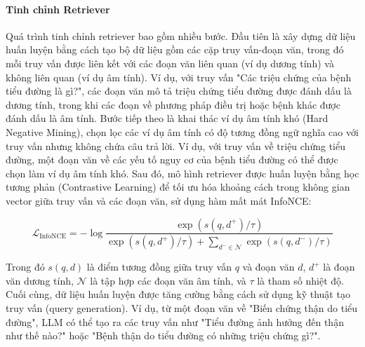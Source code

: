 \paragraph{Tinh chỉnh Retriever}
Quá trình tinh chỉnh retriever bao gồm nhiều bước. Đầu tiên là xây dựng dữ liệu huấn luyện bằng cách tạo bộ dữ liệu gồm các cặp truy vấn-đoạn văn, trong đó mỗi truy vấn được liên kết với các đoạn văn liên quan (ví dụ dương tính) và không liên quan (ví dụ âm tính). Ví dụ, với truy vấn "Các triệu chứng của bệnh tiểu đường là gì?", các đoạn văn mô tả triệu chứng tiểu đường được đánh dấu là dương tính, trong khi các đoạn về phương pháp điều trị hoặc bệnh khác được đánh dấu là âm tính. Bước tiếp theo là khai thác ví dụ âm tính khó (Hard Negative Mining), chọn lọc các ví dụ âm tính có độ tương đồng ngữ nghĩa cao với truy vấn nhưng không chứa câu trả lời. Ví dụ, với truy vấn về triệu chứng tiểu đường, một đoạn văn về các yếu tố nguy cơ của bệnh tiểu đường có thể được chọn làm ví dụ âm tính khó. Sau đó, mô hình retriever được huấn luyện bằng học tương phản (Contrastive Learning) để tối ưu hóa khoảng cách trong không gian vector giữa truy vấn và các đoạn văn, sử dụng hàm mất mát InfoNCE:

\begin{equation}
\mathcal{L}_{\text{InfoNCE}} = -\log \frac{\exp(s(q, d^+)/\tau)}{\exp(s(q, d^+)/\tau) + \sum_{d^- \in \mathcal{N}} \exp(s(q, d^-)/\tau)}
\end{equation}

Trong đó $s(q, d)$ là điểm tương đồng giữa truy vấn $q$ và đoạn văn $d$, $d^+$ là đoạn văn dương tính, $\mathcal{N}$ là tập hợp các đoạn văn âm tính, và $\tau$ là tham số nhiệt độ. Cuối cùng, dữ liệu huấn luyện được tăng cường bằng cách sử dụng kỹ thuật tạo truy vấn (query generation). Ví dụ, từ một đoạn văn về "Biến chứng thận do tiểu đường", LLM có thể tạo ra các truy vấn như "Tiểu đường ảnh hưởng đến thận như thế nào?" hoặc "Bệnh thận do tiểu đường có những triệu chứng gì?".

